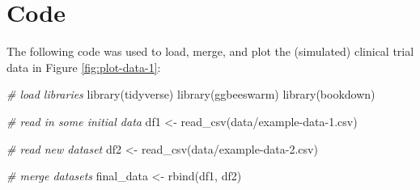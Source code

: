 \documentclass[smallextended]{svjour3}       %
\newenvironment{Shaded}{\begin{snugshade}}{\end{snugshade}}
\newcommand{\CommentTok}[1]{\textcolor[rgb]{0.56,0.35,0.01}{\textit{#1}}}
\newcommand{\FunctionTok}[1]{\textcolor[rgb]{0.00,0.00,0.00}{#1}}
\newcommand{\NormalTok}[1]{#1}
\newcommand{\OtherTok}[1]{\textcolor[rgb]{0.56,0.35,0.01}{#1}}
\newcommand{\StringTok}[1]{\textcolor[rgb]{0.31,0.60,0.02}{#1}}
\begin{document}
\hypertarget{code}{%
\section{Code}\label{code}}

The following code was used to load, merge, and plot the (simulated) clinical trial data in Figure \ref{fig:plot-data-1}:

\begin{Shaded}
\begin{Highlighting}[]
\CommentTok{\# load libraries}
\FunctionTok{library}\NormalTok{(tidyverse)}
\FunctionTok{library}\NormalTok{(ggbeeswarm)}
\FunctionTok{library}\NormalTok{(bookdown)}
\end{Highlighting}
\end{Shaded}

\begin{Shaded}
\begin{Highlighting}[]
\CommentTok{\# read in some initial data}
\NormalTok{df1 }\OtherTok{\textless{}{-}} \FunctionTok{read\_csv}\NormalTok{(}\StringTok{\textquotesingle{}data/example{-}data{-}1.csv\textquotesingle{}}\NormalTok{)}
\end{Highlighting}
\end{Shaded}

\begin{Shaded}
\begin{Highlighting}[]
\CommentTok{\# read new dataset}
\NormalTok{df2 }\OtherTok{\textless{}{-}} \FunctionTok{read\_csv}\NormalTok{(}\StringTok{\textquotesingle{}data/example{-}data{-}2.csv\textquotesingle{}}\NormalTok{)}
\end{Highlighting}
\end{Shaded}

\begin{Shaded}
\begin{Highlighting}[]
\CommentTok{\# merge datasets}
\NormalTok{final\_data }\OtherTok{\textless{}{-}} \FunctionTok{rbind}\NormalTok{(df1, df2)}
\end{Highlighting}
\end{Shaded}
\end{document}

